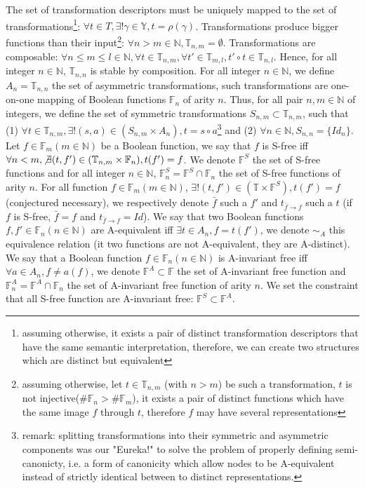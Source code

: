 \documentclass[a4paper,10pt]{article}
\newcommand{\N}{\mathbb{N}}%
\newcommand{\F}{\mathbb{F}}
\newcommand{\Y}{\mathbb{Y}}
\newcommand{\T}{\mathbb{T}}
\begin{document}
The set of transformation descriptors must be uniquely mapped to the set of transformations\footnote{assuming otherwise, it exists a pair of distinct transformation descriptors that have the same semantic interpretation, therefore, we can create two structures which are distinct but equivalent}: $\forall t\in T, \exists!\gamma\in\Y, t=\rho(\gamma)$.
Transformations produce bigger functions than their input\footnote{assuming otherwise, let $t\in\T_{n, m}$ (with $n>m$) be such a transformation, $t$ is not injective($\#\F_n > \#\F_m$), it exists a pair of distinct functions which have the same image $f$ through $t$, therefore $f$ may have several representations}: $\forall n > m \in\N, \T_{n, m}=\emptyset$.
Transformations are composable: $\forall n \leq m \leq l\in\N, \forall t\in\T_{n, m}, \forall t'\in\T_{m, l}, t' \circ t \in\T_{n, l}$.
Hence, for all integer $n\in\N$, $\T_{n, n}$ is stable by composition.
For all integer $n\in\N$, we define $A_n = \T_{n, n}$ the set of asymmetric transformations, such transformations are one-on-one mapping of Boolean functions $\F_n$ of arity $n$.
Thus, for all pair $n, m\in\N$ of integers, we define the set of symmetric transformations $S_{n, m} \subset \T_{n, m}$, such that (1) $\forall t\in\T_{n, m}, \exists!(s, a)\in(S_{n, m}\times A_n), t = s \circ a$\footnote{remark: splitting transformations into their symmetric and asymmetric components was our "Eureka!" to solve the problem of properly defining semi-canonicty, i.e. a form of canonicity which allow nodes to be A-equivalent instead of strictly identical between to distinct representations.} and (2) $\forall n\in\N, S_{n, n} = \{Id_n\}$.
Let $f\in\F_m (m\in\N)$ be a Boolean function, we say that $f$ is S-free iff $\forall n < m, \not\exists (t, f')\in(\T_{n, m}\times\F_n), t(f') = f$. We denote $\F^S$ the set of S-free functions and for all integer $n\in\N$, $\F^S_n  = \F^S\cap\F_n$ the set of S-free functions of arity $n$.
For all function $f\in\F_m (m\in\N)$, $\exists!(t, f')\in(\T\times\F^S), t(f') = f$ (conjectured necessary), we respectively denote $\bar{f}$ such a $f'$ and $t_{\bar{f}\rightarrow f}$ such a $t$ (if $f$ is S-free, $\bar{f}=f$ and $t_{\bar{f}\rightarrow f} = Id$).
We say that two Boolean functions $f, f'\in\F_n (n\in\N)$ are A-equivalent iff $\exists t\in A_n, f=t(f')$, we denote $\sim_A$ this equivalence relation (it two functions are not A-equivalent, they are A-distinct).
We say that a Boolean function $f\in\F_n (n\in\N)$ is A-invariant free iff $\forall a\in A_n, f\neq a(f)$, we denote $\F^A\subset\F$ the set of A-invariant free function and $\F^A_n = \F^A\cap\F_n$ the set of A-invariant free function of arity $n$.
We set the constraint that all S-free function are A-invariant free: $\F^S\subset\F^A$.
\end{document}
